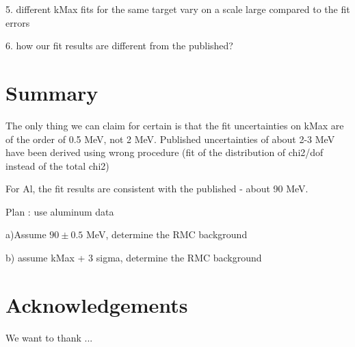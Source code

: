 \documentclass[12pt]{article}
\begin{document}
    5. different kMax fits for the same target vary on a scale large compared to the
    fit errors

    6. how our fit results are different from the published? 


\section{ Summary }


The only thing we can claim for certain is that the fit uncertainties on kMax are
of the order of 0.5 MeV, not 2 MeV. Published uncertainties of about 2-3 MeV
have been derived using wrong procedure (fit of the distribution of chi2/dof
instead of the total chi2)


For Al, the fit results are consistent with the published - about 90 MeV.


Plan : use aluminum data

a)Assume $90 \pm 0.5$ MeV, determine the RMC background

b) assume kMax + 3 sigma, determine the RMC background

\section{ Acknowledgements }

We want to thank ...




\end{document}

